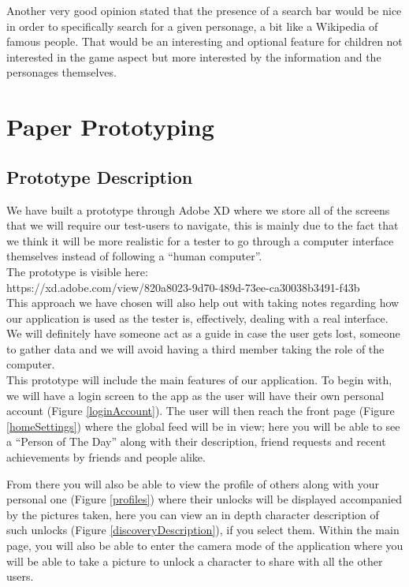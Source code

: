 \documentclass[12pt]{scrartcl}
\begin{document}
		Another very good opinion stated that the presence of a search bar would be nice in order to specifically search for a given personage, a bit like a Wikipedia of famous people. That would be an interesting and optional feature for children not interested in the game aspect but more interested by the information and the personages themselves.

	
\section{Paper Prototyping}

	\subsection{Prototype Description}

		
		We have built a prototype through Adobe XD where we store all of the screens that we will
		require our test-users to navigate, this is mainly due to the fact that we think it will be more
		realistic for a tester to go through a computer interface themselves instead of following a 
		``human computer''.\\
		
		The prototype is visible here:\\
		https://xd.adobe.com/view/820a8023-9d70-489d-73ee-ca30038b3491-f43b\\
		
		This approach we have chosen will also help out with taking notes regarding how our 
		application is used as the tester is, effectively, dealing with a real interface. We will definitely 
		have someone act as a guide in case the user gets lost, someone to gather data and we will 
		avoid having a third member taking the role of the computer.\\
	
		This prototype will include the main features of our application. To begin with, we will have a 
		login screen to the app as the user will have their own personal account (Figure
		\ref{loginAccount}). The user will then reach the front page (Figure \ref{homeSettings}) where 
		the global feed will be in view; here you will be able to see a ``Person of The  Day'' along with 
		their description, friend requests and recent achievements by friends and  people alike. 
	
		From there you will also be able to view the profile of others along with your personal one 
		(Figure \ref{profiles}) where their unlocks will be displayed accompanied by the pictures taken, 
		here you can view an in depth  character description of such unlocks (Figure 
		\ref{discoveryDescription}), if you select them. Within the main page, you will also be able to 
		enter the camera mode of the application where you will be able to take a picture to unlock a 
		character to share with all the other users.
	
\end{document}
